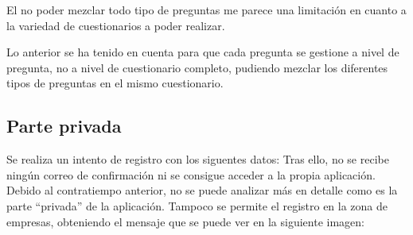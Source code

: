 El no poder mezclar todo tipo de preguntas me parece una limitación en cuanto a la variedad de cuestionarios a poder realizar.

Lo anterior se ha tenido en cuenta para que cada pregunta se gestione a nivel de pregunta, no a nivel de cuestionario completo, pudiendo mezclar los diferentes tipos de preguntas en el mismo cuestionario.

\subsection{Parte privada}
Se realiza un intento de registro con los siguentes datos:
Tras ello, no se recibe ningún correo de confirmación ni se consigue acceder a la propia aplicación.
Debido al contratiempo anterior, no se puede analizar más en detalle como es la parte ``privada'' de la aplicación.
\clearpage
Tampoco se permite el registro en la zona de empresas, obteniendo el mensaje que se puede ver en la siguiente imagen:





